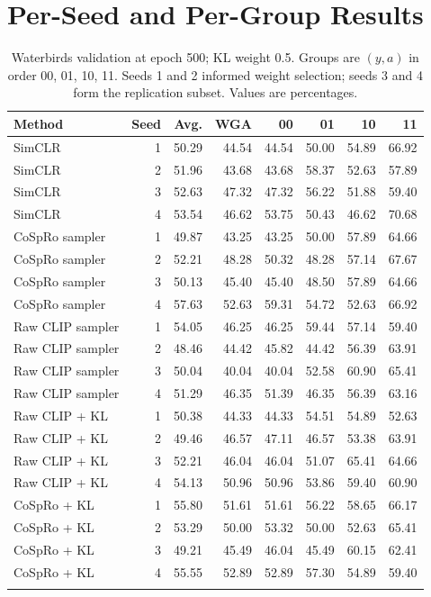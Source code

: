 \documentclass{article}
\begin{document}
\section{Per-Seed and Per-Group Results}
\label{app:seedresults}
\begin{table}[htbp]
\centering\small
\setlength{\tabcolsep}{4pt}
\caption{Waterbirds validation at epoch 500; KL weight 0.5. Groups are
$(y,a)$ in order 00, 01, 10, 11. Seeds 1 and 2 informed weight selection;
seeds 3 and 4 form the replication subset. Values are percentages.}
\begin{tabular}{lrrrrrrr}
\toprule
Method & Seed & Avg. & WGA & 00 & 01 & 10 & 11 \\
\midrule
SimCLR & 1 & 50.29 & 44.54 & 44.54 & 50.00 & 54.89 & 66.92 \\
SimCLR & 2 & 51.96 & 43.68 & 43.68 & 58.37 & 52.63 & 57.89 \\
SimCLR & 3 & 52.63 & 47.32 & 47.32 & 56.22 & 51.88 & 59.40 \\
SimCLR & 4 & 53.54 & 46.62 & 53.75 & 50.43 & 46.62 & 70.68 \\
\addlinespace
CoSpRo sampler & 1 & 49.87 & 43.25 & 43.25 & 50.00 & 57.89 & 64.66 \\
CoSpRo sampler & 2 & 52.21 & 48.28 & 50.32 & 48.28 & 57.14 & 67.67 \\
CoSpRo sampler & 3 & 50.13 & 45.40 & 45.40 & 48.50 & 57.89 & 64.66 \\
CoSpRo sampler & 4 & 57.63 & 52.63 & 59.31 & 54.72 & 52.63 & 66.92 \\
\addlinespace
Raw CLIP sampler & 1 & 54.05 & 46.25 & 46.25 & 59.44 & 57.14 & 59.40 \\
Raw CLIP sampler & 2 & 48.46 & 44.42 & 45.82 & 44.42 & 56.39 & 63.91 \\
Raw CLIP sampler & 3 & 50.04 & 40.04 & 40.04 & 52.58 & 60.90 & 65.41 \\
Raw CLIP sampler & 4 & 51.29 & 46.35 & 51.39 & 46.35 & 56.39 & 63.16 \\
\addlinespace
Raw CLIP + KL & 1 & 50.38 & 44.33 & 44.33 & 54.51 & 54.89 & 52.63 \\
Raw CLIP + KL & 2 & 49.46 & 46.57 & 47.11 & 46.57 & 53.38 & 63.91 \\
Raw CLIP + KL & 3 & 52.21 & 46.04 & 46.04 & 51.07 & 65.41 & 64.66 \\
Raw CLIP + KL & 4 & 54.13 & 50.96 & 50.96 & 53.86 & 59.40 & 60.90 \\
\addlinespace
CoSpRo + KL & 1 & 55.80 & 51.61 & 51.61 & 56.22 & 58.65 & 66.17 \\
CoSpRo + KL & 2 & 53.29 & 50.00 & 53.32 & 50.00 & 52.63 & 65.41 \\
CoSpRo + KL & 3 & 49.21 & 45.49 & 46.04 & 45.49 & 60.15 & 62.41 \\
CoSpRo + KL & 4 & 55.55 & 52.89 & 52.89 & 57.30 & 54.89 & 59.40 \\
\addlinespace
\bottomrule
\end{tabular}
\end{table}
\end{document}
